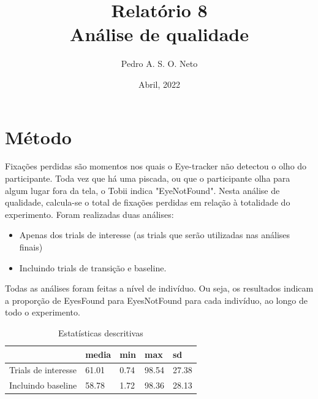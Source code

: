 \documentclass{article}
\title{Relatório 8 \\ Análise de qualidade}
\author{Pedro A. S. O. Neto}
\date{Abril, 2022}
\begin{document}
\maketitle

\section{Método}

Fixações perdidas são momentos nos quais o Eye-tracker não detectou o olho do participante. Toda vez que há uma piscada, ou que o participante olha para algum lugar fora da tela, o 
Tobii indica "EyeNotFound". Nesta análise de qualidade, calcula-se o total de fixações perdidas em relação à totalidade do experimento. Foram realizadas duas análises: 

\begin{itemize}
  \item Apenas dos trials de interesse (as trials que serão utilizadas nas análises finais)
  \item Incluindo trials de transição e baseline.
\end{itemize}

Todas as análises foram feitas a nível de indivíduo. Ou seja, os resultados indicam a proporção de EyesFound para EyesNotFound para cada indivíduo, ao longo de todo o experimento.

\begin{table}[!ht]
    \centering
    \caption{Estatísticas descritivas}
    \begin{tabular}{|l|l|l|l|l|}
    \hline
         & media & min & max & sd \\ \hline
        Trials de interesse & 61.01 & 0.74 & 98.54 & 27.38 \\
        Incluindo baseline & 58.78 & 1.72 & 98.36 & 28.13 \\ \hline
    \end{tabular}
\end{table}
\end{document}
